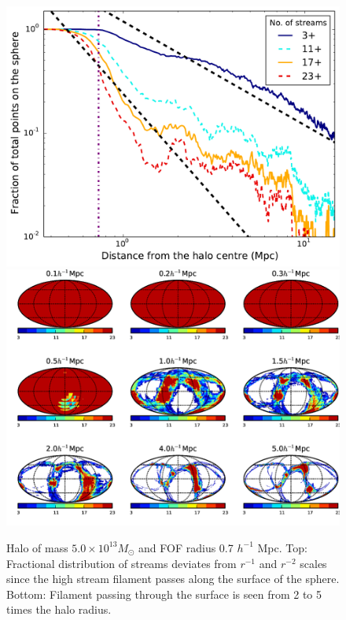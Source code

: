 \begin{figure}
\begin{minipage}[t]{.99\linewidth}
  \centering\includegraphics[width=10.cm]{Chapter3/Source_v2/fig8a}
\includegraphics[width=10.cm]{Chapter3/Source_v2/fig8b} 
\end{minipage}\hfill
\caption{ Halo of mass $5.0 \times 10^{13} M_{\odot} $   and  FOF radius 0.7 $h^{-1}$ Mpc. Top: Fractional distribution of streams deviates from $r^{-1}$ and $r^{-2}$ scales
since the high stream filament passes along the surface of the sphere. Bottom: Filament passing through the surface is 
seen from 2 to 5 times the halo radius. }
\label{fig:79}
\end{figure}

